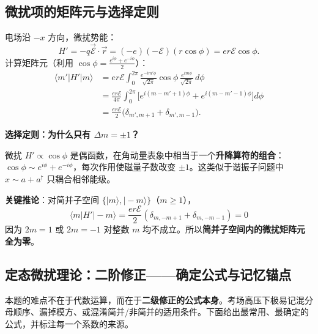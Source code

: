 \subsection{微扰项的矩阵元与选择定则}

\begin{derivationbox}[微扰项的矩阵元与选择定则]
电场沿 $-x$ 方向，微扰势能：
\[
H' = -q\vec{\mathscr{E}}\cdot\vec{r} = (-e)(-\mathscr{E})(r\cos\phi) = er\mathscr{E}\cos\phi.
\]
计算矩阵元（利用 $\cos\phi = \frac{e^{i\phi}+e^{-i\phi}}{2}$）：
\begin{align*}
\langle m'|H'|m\rangle &= er\mathscr{E}\int_0^{2\pi}\frac{e^{-im'\phi}}{\sqrt{2\pi}}\cos\phi\,\frac{e^{im\phi}}{\sqrt{2\pi}}\,d\phi\\
&= \frac{er\mathscr{E}}{4\pi}\int_0^{2\pi}\bigl[e^{i(m-m'+1)\phi} + e^{i(m-m'-1)\phi}\bigr]d\phi\\
&= \frac{er\mathscr{E}}{2}\bigl(\delta_{m',m+1} + \delta_{m',m-1}\bigr).
\end{align*}

\textbf{选择定则：为什么只有 $\Delta m = \pm 1$？}

微扰 $H' \propto \cos\phi$ 是偶函数，在角动量表象中相当于一个\textbf{升降算符的组合}：$\cos\phi \sim e^{i\phi} + e^{-i\phi}$，每次作用使磁量子数改变 $\pm 1$。这类似于谐振子问题中 $x \sim a + a^\dagger$ 只耦合相邻能级。

\textbf{关键推论}：对简并子空间 $\{|m\rangle, |-m\rangle\}$（$m\geq 1$），
\[
\langle m|H'|-m\rangle = \frac{er\mathscr{E}}{2}(\delta_{m,-m+1} + \delta_{m,-m-1}) = 0
\]
因为 $2m = 1$ 或 $2m = -1$ 对整数 $m$ 均不成立。所以\textbf{简并子空间内的微扰矩阵元全为零}。
\end{derivationbox}

\subsection{定态微扰理论：二阶修正——确定公式与记忆锚点}

本题的难点不在于代数运算，而在于\textbf{二级修正的公式本身}。考场高压下极易记混分母顺序、漏掉模方、或混淆简并/非简并的适用条件。下面给出最常用、最确定的公式，并标注每一个系数的来源。

